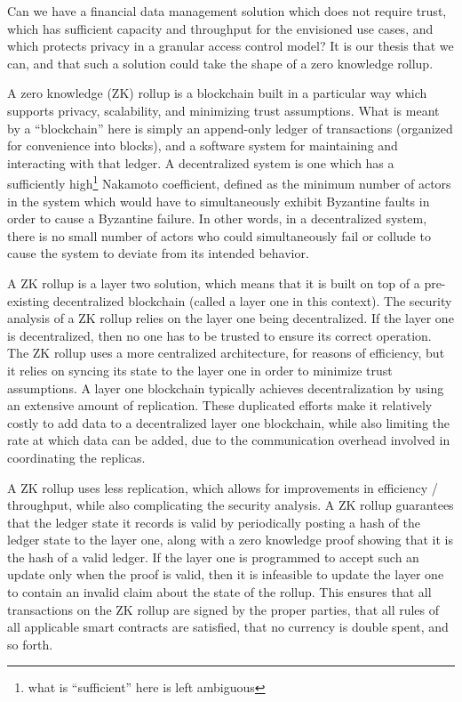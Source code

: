 \documentclass[11pt]{article}
\begin{document}
Can we have a financial data management solution which does not require trust,
which has sufficient capacity and throughput for the envisioned use cases, and
which protects privacy in a granular access control model? It is our thesis that
we can, and that such a solution could take the shape of a zero knowledge
rollup.

A zero knowledge (ZK) rollup is a blockchain built in a particular way which
supports privacy, scalability, and minimizing trust assumptions. What is meant
by a ``blockchain'' here is simply an append-only ledger of transactions (organized
for convenience into blocks), and a software system for maintaining and interacting
with that ledger. A decentralized system is one which has a sufficiently
high\footnote{what is ``sufficient'' here is left ambiguous} Nakamoto coefficient,
defined as the minimum number of actors in the system which would have to
simultaneously exhibit Byzantine faults in order to cause a Byzantine failure.
In other words, in a decentralized system, there is no small number of actors
who could simultaneously fail or collude to cause the system to deviate from
its intended behavior.

A ZK rollup is a layer two solution, which means that it is built on top of
a pre-existing decentralized blockchain (called a layer one in this context).
The security analysis of a ZK rollup relies on the layer one being decentralized.
If the layer one is decentralized, then no one has to be trusted to ensure its
correct operation. The ZK rollup uses a more centralized architecture, for reasons
of efficiency, but it relies on syncing its state to the layer one in order to
minimize trust assumptions. A layer one blockchain typically achieves decentralization
by using an extensive amount of replication. These duplicated efforts make
it relatively costly to add data to a decentralized layer one blockchain, while
also limiting the rate at which data can be added, due to the communication
overhead involved in coordinating the replicas.

A ZK rollup uses less replication, which allows for improvements in efficiency
/ throughput, while also complicating the security analysis. A ZK rollup
guarantees that the ledger state it records is valid by periodically posting
a hash of the ledger state to the layer one, along with a zero knowledge proof
showing that it is the hash of a valid ledger. If the layer one is programmed
to accept such an update only when the proof is valid, then it is infeasible to
update the layer one to contain an invalid claim about the state of the rollup.
This ensures that all transactions on the ZK rollup are signed by the proper
parties, that all rules of all applicable smart contracts are satisfied, that
no currency is double spent, and so forth.
\end{document}
